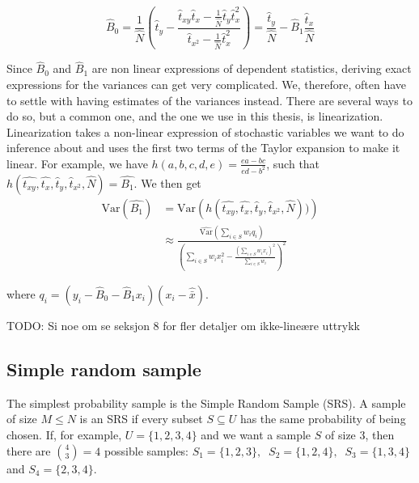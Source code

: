 \documentclass{article}
\begin{document}
\begin{equation*}
 \hat{B}_0 = \frac{1}{\widehat{N}} \left( \hat{t}_y - \frac{\hat{t}_{xy} \hat{t}_x - \frac{1}{\widehat{N}} \hat{t}_y \hat{t}_x^2}
   {\hat{t}_{x^2} - \frac{1}{\widehat{N}} \hat{t}_x^2}
 \right)
 = \frac{\hat{t}_y}{\hat{N}} - \hat{B}_1\frac{\hat{t}_x}{\hat{N}}
\end{equation*}

Since \(\hat{B}_0\) and \(\hat{B}_1\) are non linear expressions of dependent
statistics, deriving exact expressions for the variances can get very complicated. We, therefore,
often have to settle with having estimates of the variances instead.
There are several ways to do so, but a common one,
and the one we use in this thesis, is linearization. Linearization takes a
non-linear expression of stochastic variables we want to do inference about and uses
the first two terms of the Taylor expansion to make it linear.
For example, we have \(h(a, b, c, d, e) = \frac{ea - bc}{ed - b^2}\), such that
\(h(\hat{t_{xy}}, \hat{t_x}, \hat{t}_y, \hat{t}_{x^2}, \hat{N}) = \hat{B_1}\).
We then get
\begin{align*}
 \mathrm{Var}(\hat{B_1})
 &= \mathrm{Var} \left( h(\hat{t_{xy}}, \hat{t_x},
 \hat{t}_y, \hat{t}_{x^2}, \hat{N})) \right) \\
 &\approx \frac{\widehat{\mathrm{Var}}\left( \sum_{i \in S} w_i q_i \right)}
   {\left( \sum_{i \in S} w_i x_i^2 - \frac{\left( \sum_{i \in S} w_i x_i \right)^2}{\sum_{i \in S} w_i} \right)^2}
\end{align*}

where \(q_i = (y_i - \hat{B}_0 - \hat{B}_1 x_i)(x_i - \hat{\bar{x}})\).

TODO: Si noe om se seksjon 8 for fler detaljer om ikke-lineære uttrykk

\subsection{Simple random sample} \label{sec:SRS}

The simplest probability sample is the Simple Random Sample (SRS). A
sample of size \(M \leq N\) is an SRS if every subset \(S \subseteq U\) has the same
probability of being chosen.
If, for example, \(U = \{1, 2, 3, 4\}\) and we want a sample \(S\) of
size \(3\), then there are \(\binom{4}{3} = 4\)  possible samples:
\( S_1 = \{1, 2, 3\},\ \)
\( S_2 = \{1, 2, 4\},\ \)
\( S_3 = \{1, 3, 4\}\ \) and
\( S_4 = \{2, 3, 4\} \).
\end{document}
